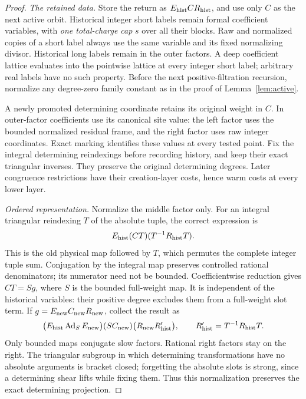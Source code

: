 \documentclass[11pt,a4paper]{article}
\theoremstyle{definition}
\newcommand{\Ad}{\operatorname{Ad}}
\begin{document}
\begin{proof}
\textit{The retained data.}
Store the return as \(E_{\rm hist}CR_{\rm hist}\), and use only \(C\)
as the next active orbit. Historical integer short labels remain
formal coefficient variables, with \emph{one total-charge cap} \(s\)
over all their blocks. Raw and normalized copies of a short label
always use the same variable and its fixed normalizing divisor.
Historical long labels remain in the outer factors. A deep
coefficient lattice evaluates into the pointwise lattice at every
integer short label; arbitrary real labels have no such property.
Before the next positive-filtration recursion, normalize any
degree-zero family constant as in the proof of
Lemma~\ref{lem:active}.

A newly promoted determining coordinate retains its original weight
in \(C\). In outer-factor coefficients use its canonical site value:
the left factor uses the bounded normalized residual frame, and the
right factor uses raw integer coordinates. Exact marking identifies
these values at every tested point. Fix the integral determining
reindexings before recording history, and keep their exact
triangular inverses. They preserve the original determining degrees.
Later congruence restrictions have their creation-layer costs, hence
warm costs at every lower layer.

\textit{Ordered representation.}
Normalize the middle factor only. For an integral triangular
reindexing \(T\) of the absolute tuple, the correct expression is
\begin{equation}\label{eq:reindex}
 E_{\rm hist}(CT)(T^{-1}R_{\rm hist}T).
\end{equation}
This is the old physical map followed by \(T\), which permutes the
complete integer tuple sum. Conjugation by the integral map preserves
controlled rational denominators; its numerator need not be bounded.
Coefficientwise reduction gives \(CT=Sg\), where \(S\) is the bounded
full-weight map. It is independent of the historical variables:
their positive degree excludes them from a full-weight slot term.
If \(g=E_{\rm new}C_{\rm new}R_{\rm new}\), collect the result as
\begin{equation}\label{eq:collect}
 \bigl(E_{\rm hist}\Ad_S E_{\rm new}\bigr)
 (SC_{\rm new})
 \bigl(R_{\rm new}R'_{\rm hist}\bigr),
 \qquad R'_{\rm hist}=T^{-1}R_{\rm hist}T.
\end{equation}
Only bounded maps conjugate slow factors. Rational right factors
stay on the right. The triangular subgroup in which determining
transformations have no absolute arguments is bracket closed;
forgetting the absolute slots is strong, since a determining shear
lifts while fixing them. Thus this normalization preserves the
exact determining projection.


\end{proof}
\end{document}
